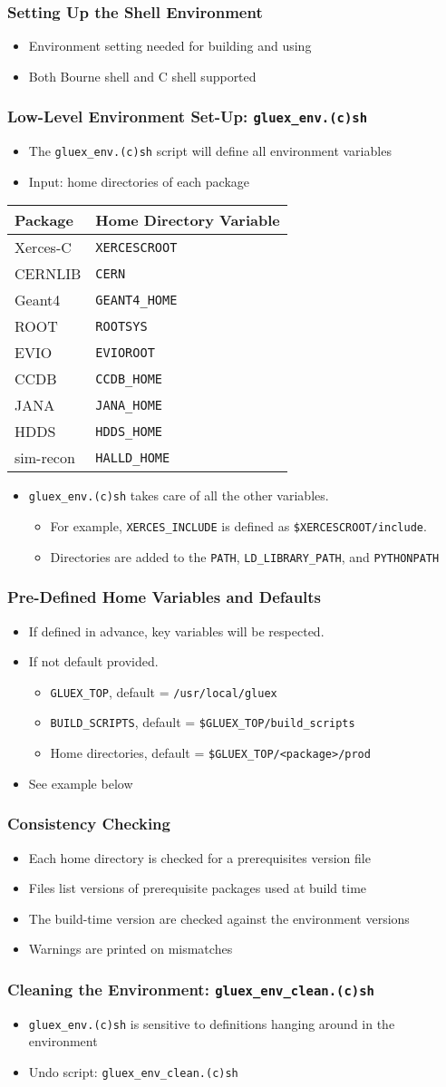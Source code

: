 \documentclass{beamer}
\newcommand{\bi}{\begin{itemize}}
\newcommand{\ei}{\end{itemize}}
\newcommand{\I}{\item}
\begin{document}
\begin{frame}\frametitle{Setting Up the Shell Environment}
\bi
\I Environment setting needed for building and using
\I Both Bourne shell and C shell supported
\ei
\end{frame}\begin{frame}\frametitle{Low-Level Environment Set-Up: {\tt gluex\_env.(c)sh}}
\bi
\I The {\tt gluex\_env.(c)sh} script will define all environment variables
\I Input: home directories of each package
\ei

\begin{center}
\begin{tabular}{|l|l|}
\hline
\bf Package & \bf Home Directory Variable \\
\hline Xerces-C & {\tt XERCESCROOT} \\
CERNLIB & {\tt CERN} \\
Geant4 & {\tt GEANT4\_HOME} \\
ROOT & {\tt ROOTSYS} \\
EVIO & {\tt EVIOROOT} \\
CCDB & {\tt CCDB\_HOME} \\
JANA & {\tt JANA\_HOME} \\
HDDS & {\tt HDDS\_HOME} \\
sim-recon & {\tt HALLD\_HOME} \\
\hline
\end{tabular}
\end{center}

\bi
\I {\tt gluex\_env.(c)sh} takes care of all the other variables.
  \bi
  \I For example, {\tt XERCES\_INCLUDE} is defined as {\tt \$XERCESCROOT/include}.
  \I Directories are added to the {\tt PATH}, {\tt LD\_LIBRARY\_PATH}, and {\tt PYTHONPATH}
  \ei
\ei
\end{frame}
\begin{frame}\frametitle{Pre-Defined Home Variables and Defaults}
\bi
\I If defined in advance, key variables will be respected.
\I If not default provided.
  \bi
  \I {\tt GLUEX\_TOP}, default =  {\tt /usr/local/gluex}
  \I {\tt BUILD\_SCRIPTS}, default = {\tt \$GLUEX\_TOP/build\_scripts}
  \I Home directories, default = {\tt \$GLUEX\_TOP/<package>/prod}
  \ei
\I See example below
\ei
\end{frame}\begin{frame}\frametitle{Consistency Checking}
\bi
\I Each home directory is checked for a prerequisites version file
\I Files list versions of prerequisite packages used at build time
\I The build-time version are checked against the environment versions
\I Warnings are printed on mismatches
\ei
\end{frame}\begin{frame}\frametitle{Cleaning the Environment: {\tt gluex\_env\_clean.(c)sh}}
\bi
\I {\tt gluex\_env.(c)sh} is sensitive to definitions hanging
around in the environment
\I Undo script: {\tt gluex\_env\_clean.(c)sh}
\ei
\end{frame}
\end{document}
